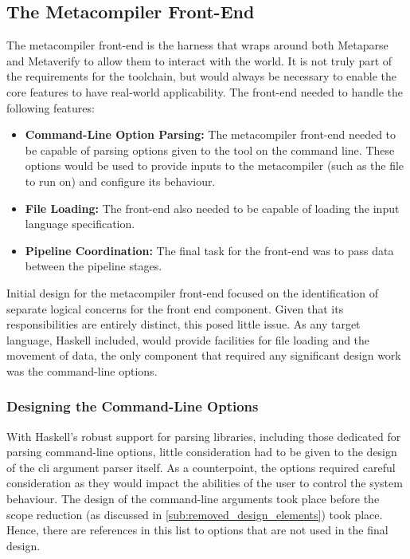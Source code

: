 \subsection{The Metacompiler Front-End} %
\label{sub:the_metacompiler_front_end}
The metacompiler front-end is the harness that wraps around both Metaparse and Metaverify to allow them to interact with the world. 
It is not truly part of the requirements for the toolchain, but would always be necessary to enable the core features to have real-world applicability. 
The front-end needed to handle the following features:
\begin{itemize}
    \item \textbf{Command-Line Option Parsing:} The metacompiler front-end needed to be capable of parsing options given to the tool on the command line.
    These options would be used to provide inputs to the metacompiler (such as the file to run on) and configure its behaviour. 
    \item \textbf{File Loading:} The front-end also needed to be capable of loading the input language specification.
    \item \textbf{Pipeline Coordination:} The final task for the front-end was to pass data between the pipeline stages.
\end{itemize}

Initial design for the metacompiler front-end focused on the identification of separate logical concerns for the front end component.
Given that its responsibilities are entirely distinct, this posed little issue.
As any target language, Haskell included, would provide facilities for file loading and the movement of data, the only component that required any significant design work was the command-line options. 

\subsubsection{Designing the Command-Line Options} %
\label{ssub:designing_the_command_line_options}
With Haskell's robust support for parsing libraries, including those dedicated for parsing command-line options, little consideration had to be given to the design of the \gls{cli} argument parser itself.
As a counterpoint, the options required careful consideration as they would impact the abilities of the user to control the system behaviour. 
The design of the command-line arguments took place before the scope reduction (as discussed in \autoref{sub:removed_design_elements}) took place.
Hence, there are references in this list to options that are not used in the final design.\\


